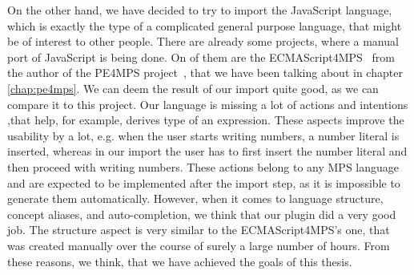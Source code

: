 On the other hand, we have decided to try to import the JavaScript language, which is exactly the type of a complicated general purpose language, that might be of interest to other people.
There are already some projects, where a manual port of JavaScript is being done.
On of them are the ECMAScript4MPS~\cite{ECMAScript4MPS} from the author of the PE4MPS project~\cite{PE4MPS}, that we have been talking about in chapter \ref{chap:pe4mps}.
We can deem the result of our import quite good, as we can compare it to this project.
Our language is missing a lot of actions and intentions ,that help, for example, derives type of an expression.
These aspects improve the usability by a lot, e.g. when the user starts writing numbers, a number literal is inserted, whereas in our import the user has to first insert the number literal and then proceed with writing numbers.
These actions belong to any MPS language and are expected to be implemented after the import step, as it is impossible to generate them automatically.
However, when it comes to language structure, concept aliases, and auto-completion, we think that our plugin did a very good job.
The structure aspect is very similar to the ECMAScript4MPS's one, that was created manually over the course of surely a large number of hours.
From these reasons, we think, that we have achieved the goals of this thesis.
